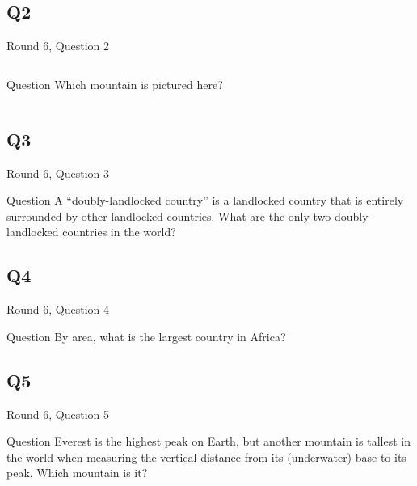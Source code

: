\documentclass[11pt]{beamer}
\begin{document}
\subsection*{Q2}
\begin{frame}[t]{Round 6, Question 2}
\begin{columns}[T,totalwidth=\linewidth]
\begin{column}{0.32\linewidth}
\begin{block}{Question}
Which mountain is pictured here?
\end{block}
\end{column}
\begin{column}{0.65\linewidth}
\begin{center}
\texttt{[image: \{Images/materhorn]}.jpg}
\end{center}
\end{column}
\end{columns}
\end{frame}
\subsection*{Q3}
\begin{frame}[t]{Round 6, Question 3}
\begin{block}{Question}
A ``doubly-landlocked country'' is a landlocked country that is entirely surrounded by other landlocked countries. What are the only two doubly-landlocked countries in the world?
\end{block}
\end{frame}
\subsection*{Q4}
\begin{frame}[t]{Round 6, Question 4}
\begin{block}{Question}
By area, what is the largest country in Africa?
\end{block}
\end{frame}
\subsection*{Q5}
\begin{frame}[t]{Round 6, Question 5}
\begin{block}{Question}
Everest is the highest peak on Earth, but another mountain is tallest in the world when measuring the vertical distance from its (underwater) base to its peak. Which mountain is it?
\end{block}
\end{frame}
\end{document}
